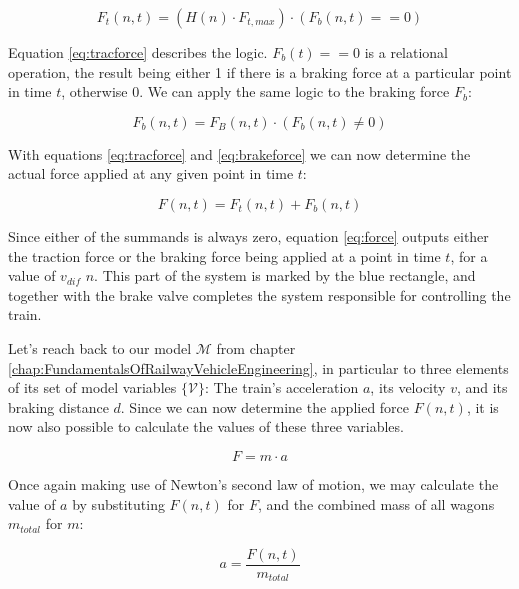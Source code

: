\begin{equation}
\label{eq:tracforce}
F_{t}(n,t) = (H(n) \cdot F_{t,max}) \cdot (F_{b}(n,t) == 0) 
\end{equation}

\noindent
Equation \ref{eq:tracforce} describes the logic. $F_{b}(t) == 0$ is a relational operation, the result being either 1 if there is a braking force at a particular point in time $t$, otherwise 0. We can apply the same logic to the braking force $F_{b}$:

\begin{equation}
\label{eq:brakeforce}
F_{b}(n,t) = F_{B}(n,t) \cdot (F_{b}(n,t) \neq 0)
\end{equation}

\noindent
With equations \ref{eq:tracforce} and \ref{eq:brakeforce} we can now determine the actual force applied at any given point in time $t$:

\begin{equation}
\label{eq:force}
F(n,t) = F_{t}(n,t) + F_{b}(n,t) 
\end{equation} 

\noindent
Since either of the summands is always zero, equation \ref{eq:force} outputs either the traction force or the braking force being applied at a point in time $t$, for a value of $v_{dif}$ $n$. This part of the system is marked by the blue rectangle, and together with the brake valve completes the system responsible for controlling the train.
\par\noindent
Let's reach back to our model ${\mathcal{M}}$ from chapter \ref{chap:FundamentalsOfRailwayVehicleEngineering}, in particular to three elements of its set of model variables $\{{\mathcal{V}}\}$: The train's acceleration $a$, its velocity $v$, and its braking distance $d$. Since we can now determine the applied force $F(n,t)$, it is now also possible to calculate the values of these three variables.

\begin{equation}
\label{eq:newton}
F = m \cdot a
\end{equation}

\noindent
Once again making use of Newton's second law of motion, we may calculate the value of $a$ by substituting $F(n,t)$ for $F$, and the combined mass of all wagons $m_{total}$ for $m$:

\begin{equation}
\label{eq:acceleration}
a = \frac{F(n,t)}{m_{total}}
\end{equation}
	
